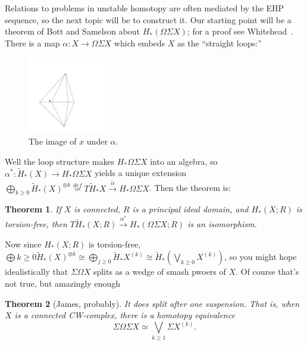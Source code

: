 \documentclass{article}
\newcommand{\Suspend}{\Sigma}
\newcommand{\Loops}{\Omega}
\newtheorem{thm}{Theorem}[section]
\begin{document}
Relations to problems in unstable homotopy are often mediated by the EHP sequence, so the next topic will be to construct it.  Our starting point will be a theorem of Bott and Samelson about $H_*(\Loops \Suspend X)$; for a proof see Whitehead~\cite{Whitehead}.  There is a map $\alpha: X \to \Loops \Suspend X$ which embeds $X$ as the ``straight loops:''
\begin{figure}[h!]
\centering\includegraphics[width=0.3\textwidth]{figures/17.pdf}
\caption{\small The image of $x$ under $\alpha$.}
\end{figure}
Well the loop structure makes $H_* \Loops \Suspend X$ into an algebra, so $\alpha^*: \widetilde H_*(X) \to H_* \Loops \Suspend X$ yields a unique extension $\bigoplus_{k \ge 0} \widetilde H_*(X)^{\otimes k} \stackrel{def}{=} T \widetilde H_* X \stackrel{\tilde \alpha}{\to} H_* \Loops \Suspend X$.  Then the theorem is:
\begin{thm}
If $X$ is connected, $R$ is a principal ideal domain, and $H_*(X; R)$ is torsion-free, then $T \widetilde H_*(X; R) \stackrel{\alpha^*}{\to} H_*(\Loops \Suspend X; R)$ is an isomorphism.
\end{thm}
Now since $H_*(X; R)$ is torsion-free, $\bigoplus{k \ge 0} \widetilde H_*(X)^{\otimes k} \cong \bigoplus_{j \ge 0} \widetilde H_* X^{(k)} \cong \widetilde H_*(\bigvee_{k \ge 0} X^{(k)})$, so you might hope idealistically that $\Suspend \Loops X$ splits as a wedge of smash pwoers of $X$.  Of course that's not true, but amazingly enough
\begin{thm}[James, probably]
It \emph{does} split after one suspension.  That is, when $X$ is a connected CW-complex, there is a homotopy equivalence
\[
\Suspend \Loops \Suspend X \simeq \bigvee_{k \ge 1} \Suspend X^{(k)}
.\]
\end{thm}
\end{document}
